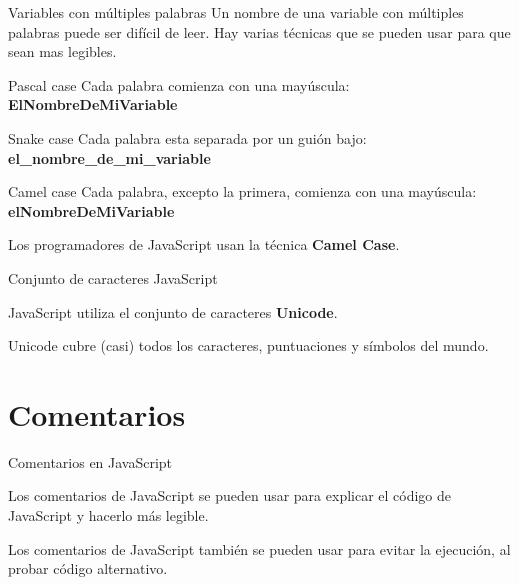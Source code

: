 \begin{frame}[c]{Variables con múltiples palabras}
  Un nombre de una variable con múltiples palabras puede ser difícil de leer.
  Hay varias técnicas que se pueden usar para que sean mas legibles.
  \pausa
  \begin{block}{Pascal case}
    Cada palabra comienza con una mayúscula:
    \textbf{ElNombreDeMiVariable}
  \end{block}
  \pausa
  \begin{block}{Snake case}
    Cada palabra esta separada por un guión bajo:
    \textbf{el\_nombre\_de\_mi\_variable}
  \end{block}
  \pausa
  \begin{exampleblock}{Camel case}
    Cada palabra, excepto la primera, comienza con una mayúscula:
    \textbf{elNombreDeMiVariable}

    \vspace{\baselineskip}
    Los programadores de JavaScript usan la técnica \textbf{Camel Case}.
  \end{exampleblock}
\end{frame}

\begin{frame}[c]{Conjunto de caracteres JavaScript}

  JavaScript utiliza el conjunto de caracteres \textbf{Unicode}.

  \vspace{\baselineskip}
  Unicode cubre (casi) todos los caracteres, puntuaciones y símbolos del mundo.
\end{frame}

\section{Comentarios}

\begin{frame}[c]{Comentarios en JavaScript}

  Los comentarios de JavaScript se pueden usar para explicar
  el código de JavaScript y hacerlo más legible.

  \vspace{\baselineskip}
  Los comentarios de JavaScript también se pueden usar para
  evitar la ejecución, al probar código alternativo.
\end{frame}

